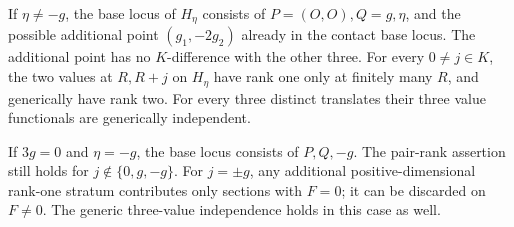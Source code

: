 \begin{lemma}
\label{lem:ss-third-value-projection}
If $\eta\ne-g$, the base locus of $H_\eta$ consists of
$P=(O,O),Q=g,\eta$, and the possible additional point
$(g_1,-2g_2)$ already in the contact base locus. The additional
point has no $K$-difference with the other three.
For every $0\ne j\in K$, the two values at $R,R+j$ on $H_\eta$
have rank one only at finitely many $R$, and generically have rank
two. For every three distinct translates their three value
functionals are generically independent.

If $3g=0$ and $\eta=-g$, the base locus consists of $P,Q,-g$.
The pair-rank assertion still holds for $j\notin\{0,g,-g\}$.
For $j=\pm g$, any additional positive-dimensional rank-one
stratum contributes only sections with $F=0$; it can be discarded
on $F\ne0$. The generic three-value independence holds in this
case as well.
\end{lemma}
